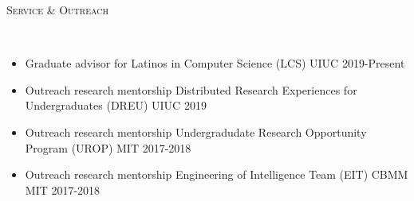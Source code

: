 \documentclass{article}
\newenvironment{changemargin}[2]{%
  \begin{list}{}{%
    \setlength{\topsep}{0pt}%
    \setlength{\leftmargin}{#1}%
    \setlength{\rightmargin}{#2}%
    \setlength{\listparindent}{\parindent}%
    \setlength{\itemindent}{\parindent}%
    \setlength{\parsep}{\parskip}%
  }%
  \item[]}{\end{list}
}
\newcommand{\lineover}{
	\begin{changemargin}{-0.05in}{-0.05in}
		\vspace*{-8pt}
		\hrulefill \\
		\vspace*{-2pt}
	\end{changemargin}
}
\newcommand{\header}[1]{
	\begin{changemargin}{-0.5in}{-0.5in}
		\scshape{#1}\\
  	\lineover
	\end{changemargin}
}
\newenvironment{body} {
	\vspace*{-16pt}
	\begin{changemargin}{-0.25in}{-0.5in}
  }	
	{\end{changemargin}
}
\begin{document}

\header{Service \& Outreach}

\begin{body}

\vspace{16pt}
\begin{itemize}
    \item Graduate advisor for Latinos in Computer Science (LCS) UIUC 2019-Present
    \item Outreach research mentorship Distributed Research Experiences for Undergraduates (DREU) UIUC 2019
    \item Outreach research mentorship Undergradudate Research Opportunity Program (UROP) MIT 2017-2018 
    \item Outreach research mentorship Engineering of Intelligence Team (EIT) CBMM MIT 2017-2018
\end{itemize}

\end{body}
\end{document}
